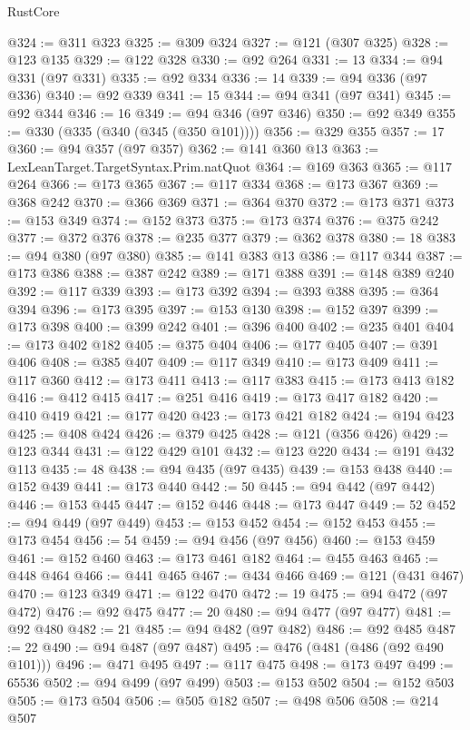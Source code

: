 \begin{lexlean}{RustCore}
\begin{coremodule}
@324 := @311 @323
@325 := @309 @324
@327 := @121 (@307 @325)
@328 := @123 @135
@329 := @122 @328
@330 := @92 @264
@331 := 13
@334 := @94 @331 (@97 @331)
@335 := @92 @334
@336 := 14
@339 := @94 @336 (@97 @336)
@340 := @92 @339
@341 := 15
@344 := @94 @341 (@97 @341)
@345 := @92 @344
@346 := 16
@349 := @94 @346 (@97 @346)
@350 := @92 @349
@355 := @330 (@335 (@340 (@345 (@350 @101))))
@356 := @329 @355
@357 := 17
@360 := @94 @357 (@97 @357)
@362 := @141 @360 @13
@363 := LexLeanTarget.TargetSyntax.Prim.natQuot
@364 := @169 @363
@365 := @117 @264
@366 := @173 @365
@367 := @117 @334
@368 := @173 @367
@369 := @368 @242
@370 := @366 @369
@371 := @364 @370
@372 := @173 @371
@373 := @153 @349
@374 := @152 @373
@375 := @173 @374
@376 := @375 @242
@377 := @372 @376
@378 := @235 @377
@379 := @362 @378
@380 := 18
@383 := @94 @380 (@97 @380)
@385 := @141 @383 @13
@386 := @117 @344
@387 := @173 @386
@388 := @387 @242
@389 := @171 @388
@391 := @148 @389 @240
@392 := @117 @339
@393 := @173 @392
@394 := @393 @388
@395 := @364 @394
@396 := @173 @395
@397 := @153 @130
@398 := @152 @397
@399 := @173 @398
@400 := @399 @242
@401 := @396 @400
@402 := @235 @401
@404 := @173 @402 @182
@405 := @375 @404
@406 := @177 @405
@407 := @391 @406
@408 := @385 @407
@409 := @117 @349
@410 := @173 @409
@411 := @117 @360
@412 := @173 @411
@413 := @117 @383
@415 := @173 @413 @182
@416 := @412 @415
@417 := @251 @416
@419 := @173 @417 @182
@420 := @410 @419
@421 := @177 @420
@423 := @173 @421 @182
@424 := @194 @423
@425 := @408 @424
@426 := @379 @425
@428 := @121 (@356 @426)
@429 := @123 @344
@431 := @122 @429 @101
@432 := @123 @220
@434 := @191 @432 @113
@435 := 48
@438 := @94 @435 (@97 @435)
@439 := @153 @438
@440 := @152 @439
@441 := @173 @440
@442 := 50
@445 := @94 @442 (@97 @442)
@446 := @153 @445
@447 := @152 @446
@448 := @173 @447
@449 := 52
@452 := @94 @449 (@97 @449)
@453 := @153 @452
@454 := @152 @453
@455 := @173 @454
@456 := 54
@459 := @94 @456 (@97 @456)
@460 := @153 @459
@461 := @152 @460
@463 := @173 @461 @182
@464 := @455 @463
@465 := @448 @464
@466 := @441 @465
@467 := @434 @466
@469 := @121 (@431 @467)
@470 := @123 @349
@471 := @122 @470
@472 := 19
@475 := @94 @472 (@97 @472)
@476 := @92 @475
@477 := 20
@480 := @94 @477 (@97 @477)
@481 := @92 @480
@482 := 21
@485 := @94 @482 (@97 @482)
@486 := @92 @485
@487 := 22
@490 := @94 @487 (@97 @487)
@495 := @476 (@481 (@486 (@92 @490 @101)))
@496 := @471 @495
@497 := @117 @475
@498 := @173 @497
@499 := 65536
@502 := @94 @499 (@97 @499)
@503 := @153 @502
@504 := @152 @503
@505 := @173 @504
@506 := @505 @182
@507 := @498 @506
@508 := @214 @507

\end{coremodule}
\end{lexlean}
